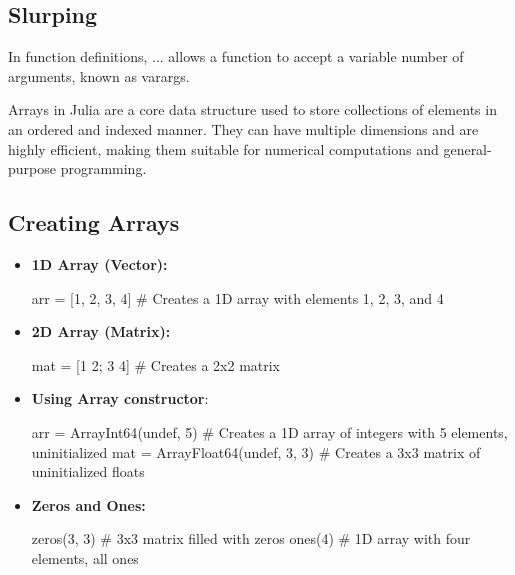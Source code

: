 \documentclass{report}
\begin{document}
    \bigbreak \noindent 
    \subsection{Slurping}
    \bigbreak \noindent 
    In function definitions, ... allows a function to accept a variable number of arguments, known as varargs.
    \bigbreak \noindent 

    \pagebreak 
    \bigbreak \noindent 
    Arrays in Julia are a core data structure used to store collections of elements in an ordered and indexed manner. They can have multiple dimensions and are highly efficient, making them suitable for numerical computations and general-purpose programming.
    \bigbreak \noindent 
    \subsection{Creating Arrays}
    \bigbreak \noindent 
    \begin{itemize}
        \item \textbf{1D Array (Vector):}
            \bigbreak \noindent 
            \begin{jlcode}
            arr = [1, 2, 3, 4]  # Creates a 1D array with elements 1, 2, 3, and 4
            \end{jlcode}
        \item \textbf{2D Array (Matrix):}
            \bigbreak \noindent 
            \begin{jlcode}
                mat = [1 2; 3 4]  # Creates a 2x2 matrix
            \end{jlcode}
        \item \textbf{Using Array constructor}:
            \bigbreak \noindent 
            \begin{jlcode}
            arr = Array{Int64}(undef, 5)  # Creates a 1D array of integers with 5 elements, uninitialized
            mat = Array{Float64}(undef, 3, 3)  # Creates a 3x3 matrix of uninitialized floats
            \end{jlcode}
        \item \textbf{Zeros and Ones:}
            \begin{jlcode}
            zeros(3, 3)  # 3x3 matrix filled with zeros
            ones(4)      # 1D array with four elements, all ones
            \end{jlcode}
    \end{itemize}
    \bigbreak \noindent 
\end{document}
